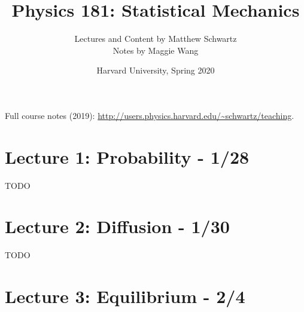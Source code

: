 \documentclass[8pt]{article}
\title{Physics 181: Statistical Mechanics}
\author{Lectures and Content by Matthew Schwartz \\
Notes by Maggie Wang}
\date{Harvard University, Spring 2020}
\begin{document}
\small

\maketitle

\noindent Full course notes (2019): \url{http://users.physics.harvard.edu/~schwartz/teaching}.

\begin{multicols*}{2}
  \tableofcontents
\end{multicols*}

\newpage

\fancyhfoffset[E,O]{0pt}


\twocolumn

\section{Lecture 1: Probability - 1/28}
TODO
\lipsum[1-3]

\section{Lecture 2: Diffusion - 1/30}
TODO
\lipsum[1-3]

\newpage

\section{Lecture 3: Equilibrium - 2/4}


\end{document}
